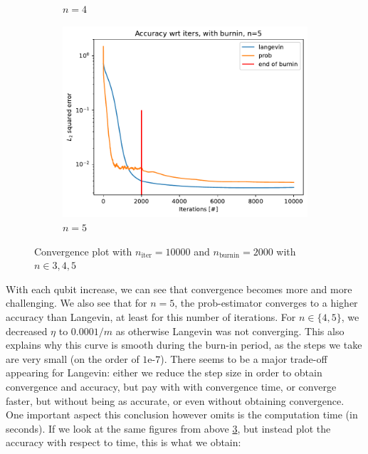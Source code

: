 \documentclass[12pt]{memoir}
\newcommand{\nitern}[1]{$n_{\text{iter}}=#1$}
\newcommand{\nburninn}[1]{$n_{\text{burnin}}=#1$}
\begin{document}
\begin{figure}[H]
\begin{subfigure}[b]{0.49\textwidth}
        \caption{$n=4$}
        \label{fig:conv-plot-diff-n-4-sub}
    \end{subfigure}
    \begin{subfigure}[b]{0.49\textwidth}
        \centering
        \includegraphics[width=\textwidth]{figures/experiments/baseline/diff_n_qubits/iters_acc_comp_iters_no_avg_n5-1.png}
        \caption{$n=5$}
        \label{fig:conv-plot-diff-n-5-sub}
    \end{subfigure}
    \caption{Convergence plot with \nitern{10000} and \nburninn{2000} with $n\in{3,4,5}$}
    \label{fig:conv-plot-diff-n}
\end{figure}

With each qubit increase, we can see that convergence becomes more and more challenging. We also see that for $n=5$, the prob-estimator converges to a higher accuracy than Langevin, at least for this number of iterations. For $n\in\{4,5\}$, we decreased $\eta$ to $0.0001/m$ as otherwise Langevin was not converging. This also explains why this curve is smooth during the burn-in period, as the steps we take are very small (on the order of $1\text{e-}7$). There seems to be a major trade-off appearing for Langevin: either we reduce the step size in order to obtain convergence and accuracy, but pay with with convergence time, or converge faster, but without being as accurate, or even without obtaining convergence. One important aspect this conclusion however omits is the computation time (in seconds). If we look at the same figures from above \ref{fig:conv-plot-diff-n}, but instead plot the accuracy with respect to time, this is what we obtain:
\end{document}
